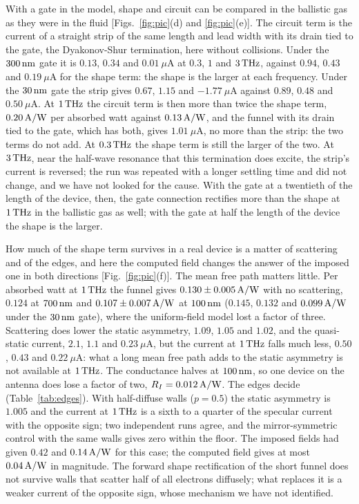With a gate in the model, shape and circuit can be compared in the
ballistic gas as they were in the fluid [Figs.~\ref{fig:pic}(d) and
\ref{fig:pic}(e)]. The circuit term is the current of a straight strip
of the same length and lead width with its drain tied to the gate, the
Dyakonov-Shur termination, here without collisions. Under the $300\,\mathrm{nm}$
gate it is $0.13$, $0.34$ and $0.01\ \mu$A at $0.3$, $1$ and $3\,\mathrm{THz}$,
against $0.94$, $0.43$ and $0.19\ \mu$A for the shape term: the shape is
the larger at each frequency. Under the $30\,\mathrm{nm}$ gate the strip gives
$0.67$, $1.15$ and $-1.77\ \mu$A against $0.89$, $0.48$ and $0.50\ \mu$A.
At $1\,\mathrm{THz}$ the circuit term is then more than twice the shape term,
$0.20\,\mathrm{A/W}$ per absorbed watt against $0.13\,\mathrm{A/W}$, and the funnel with its
drain tied to the gate, which has both, gives $1.01\ \mu$A, no more than
the strip: the two terms do not add. At $0.3\,\mathrm{THz}$ the shape term is still
the larger of the two. At $3\,\mathrm{THz}$, near the half-wave resonance that this
termination does excite, the strip's current is reversed; the run was
repeated with a longer settling time and did not change, and we have not
looked for the cause. With the gate at a twentieth of the length of the
device, then, the gate connection rectifies more than the shape at
$1\,\mathrm{THz}$ in the ballistic gas as well; with the gate at half the length
of the device the shape is the larger.

How much of the shape term survives in a real device is a matter of
scattering and of the edges, and here the computed field changes the
answer of the imposed one in both directions [Fig.~\ref{fig:pic}(f)].
The mean free path matters little. Per absorbed watt at $1\,\mathrm{THz}$ the
funnel gives $0.130\pm0.005\,\mathrm{A/W}$ with no scattering, $0.124$ at $700\,\mathrm{nm}$
and $0.107\pm0.007\,\mathrm{A/W}$ at $100\,\mathrm{nm}$ ($0.145$, $0.132$ and $0.099\,\mathrm{A/W}$ under
the $30\,\mathrm{nm}$ gate), where the uniform-field model lost a factor of three.
Scattering does lower the static asymmetry, $1.09$, $1.05$ and $1.02$,
and the quasi-static current, $2.1$, $1.1$ and $0.23\ \mu$A, but the
current at $1\,\mathrm{THz}$ falls much less, $0.50$, $0.43$ and $0.22\ \mu$A: what
a long mean free path adds to the static asymmetry is not available at
$1\,\mathrm{THz}$. The
conductance halves at $100\,\mathrm{nm}$, so one device on the antenna does lose a
factor of two, $R_{I}=0.012\,\mathrm{A/W}$. The edges decide
(Table~\ref{tab:edges}). With half-diffuse walls
($p=0.5$) the static asymmetry is $1.005$ and the
current at $1\,\mathrm{THz}$ is a sixth to a quarter of the specular current with
the opposite sign; two independent runs agree, and
the mirror-symmetric control with the same walls gives zero within the
floor. The imposed fields had given $0.42$ and $0.14\,\mathrm{A/W}$ for this case;
the computed field gives at most $0.04\,\mathrm{A/W}$ in magnitude. The forward
shape rectification of the short funnel does not survive walls that
scatter half of all electrons diffusely; what replaces it is a weaker
current of the opposite sign, whose mechanism we have not identified.

